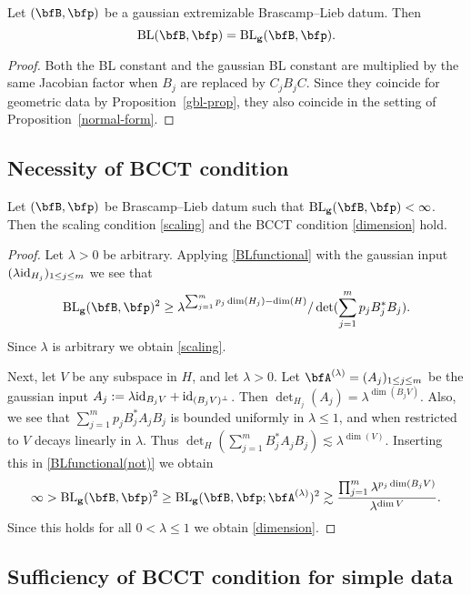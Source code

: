 \begin{corollary}
\label{cor:Lieb:gauss-extr}
Let $(\bfB,\p)$ be a gaussian extremizable Bras\-camp--Lieb datum.
Then
\[
\BL(\bfB,\p) = \BLg(\bfB,\p).
\]
\end{corollary}

\begin{proof}
Both the BL constant and the gaussian BL constant are multiplied by the same Jacobian factor when $B_{j}$ are replaced by $C_{j}B_{j}C$.
Since they coincide for geometric data by Proposition~\ref{gbl-prop}, they also coincide in the setting of Proposition~\ref{normal-form}.
\end{proof}

\subsection{Necessity of BCCT condition}

\begin{lemma}\label{necc}
Let $(\bfB,\p)$ be Brascamp--Lieb datum such that $\BLg(\bfB,\p) < \infty$.
Then the scaling condition \eqref{scaling} and the BCCT condition \eqref{dimension} hold.
\end{lemma}

\begin{proof}
Let $\lambda > 0$ be arbitrary.
Applying \eqref{BLfunctional} with the gaussian input $(\lambda \mathrm{id}_{H_j})_{1 \leq j \leq m}$ we see that
\[\BLg(\bfB,\p)^{2} \geq \lambda^{\sum_{j=1}^m p_j \dim(H_j) - \dim(H)} / \det( \sum_{j=1}^m p_{j} B_j^* B_j ).\]
Since $\lambda$ is arbitrary we obtain \eqref{scaling}.

Next, let $V$ be any subspace in $H$, and let $\lambda>0$.
Let $\A^{(\lambda)} = (A_j)_{1 \leq j \leq m}$ be the gaussian input $A_j := \lambda \mathrm{id}_{B_j V} + \mathrm{id}_{(B_j V)^\perp}$.
Then $\det_{H_j}(A_j) = \lambda^{\dim(B_j V)}$.
Also, we see that $\sum_{j=1}^m p_{j} B_j^* A_j B_j$ is bounded uniformly in $\lambda \leq 1$, and when restricted to $V$ decays linearly in $\lambda$.
Thus $\det_H(\sum_{j=1}^m B_j^* A_j B_j) \lesssim \lambda^{\dim(V)}$.
Inserting this in \eqref{BLfunctional(not)} we obtain
\[
\infty
>
\BLg(\bfB,\p)^{2}
\geq
\BLg(\bfB,\p; \A^{(\lambda)})^{2}
\gtrsim
\frac{\prod_{j=1}^{m} \lambda^{p_{j} \dim(B_{j} V)}}{\lambda^{\dim V}}.
\]
Since this holds for all $0 < \lambda \leq 1$ we obtain \eqref{dimension}.
\end{proof}


\subsection{Sufficiency of BCCT condition for simple data}
\label{sec:gaussian-BL-finite}


